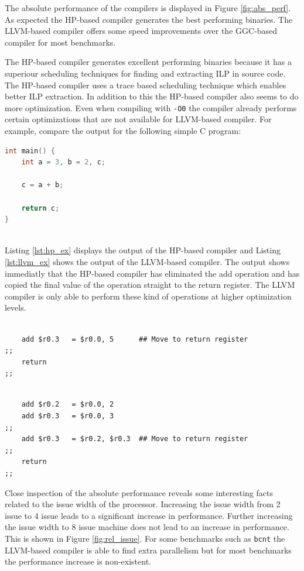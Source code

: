 The absolute performance of the compilers is displayed in Figure \ref{fig:abs_perf}. As expected the HP-based compiler generates the best performing binaries. The LLVM-based compiler offers some speed improvements over the GGC-based compiler for most benchmarks. 

The HP-based compiler generates excellent performing binaries because it has a superiour scheduling techniques for finding and extracting ILP in source code. The HP-based compiler uses a trace based scheduling technique which enables better ILP extraction. In addition to this the HP-based compiler also seems to do more optimization. Even when compiling with \texttt{-O0} the compiler already performs certain optimizations that are not available for LLVM-based compiler. For example, compare the output for the following simple C program:

\begin{lstlisting}[language=c]
int main() {
	int a = 3, b = 2, c;

	c = a + b;

	return c;
}
	
\end{lstlisting}

Listing \ref{lst:hp_ex} displays the output of the HP-based compiler and Listing \ref{lst:llvm_ex} shows the output of the LLVM-based compiler. The output shows immediatly that the HP-based compiler has eliminated the add operation and has copied the final value of the operation straight to the return register. The LLVM compiler is only able to perform these kind of operations at higher optimization levels.

\begin{lstlisting}[language=rvex,label=lst:hp_ex, caption={HP compiler output}]

	add $r0.3   = $r0.0, 5  	## Move to return register
;;
	return
;;
\end{lstlisting}

\begin{lstlisting}[language=rvex,label=lst:llvm_ex, caption={LLVM compiler output}]

	add $r0.2 	= $r0.0, 2
	add $r0.3 	= $r0.0, 3	
;;
	add $r0.3   = $r0.2, $r0.3  ## Move to return register
;;
	return
;;
\end{lstlisting}

Close inspection of the absolute performance reveals some interesting facts related to the issue width of the processor. Increasing the issue width from 2 issue to 4 issue leads to a significant increase in performance. Further increasing the issue width to 8 issue machine does not lead to an increase in performance. This is shown in Figure \ref{fig:rel_issue}. For some benchmarks such as \texttt{bcnt} the LLVM-based compiler is able to find extra parallelism but for most benchmarks the performance increase is non-existent.

